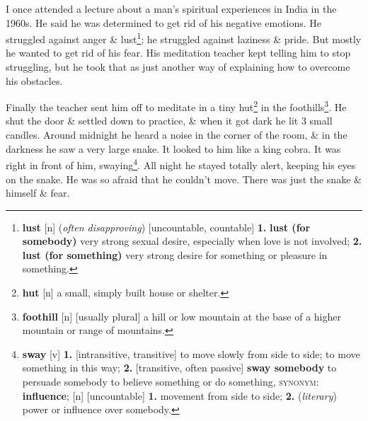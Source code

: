 \documentclass[oneside]{book}
\numberwithin{equation}{section}
\begin{document}
I once attended a lecture about a man's spiritual experiences in India in the 1960s. He said he was determined to get rid of his negative emotions. He struggled against anger \& lust\footnote{\textbf{lust} [n] (\textit{often disapproving}) [uncountable, countable] \textbf{1.} \textbf{lust (for somebody)} very strong sexual desire, especially when love is not involved; \textbf{2.} \textbf{lust (for something)} very strong desire for something or pleasure in something.}; he struggled against laziness \& pride. But mostly he wanted to get rid of his fear. His meditation teacher kept telling him to stop struggling, but he took that as just another way of explaining how to overcome his obstacles.

Finally the teacher sent him off to meditate in a tiny hut\footnote{\textbf{hut} [n] a small, simply built house or shelter.} in the foothills\footnote{\textbf{foothill} [n] [usually plural] a hill or low mountain at the base of a higher mountain or range of mountains.}. He shut the door \& settled down to practice, \& when it got dark he lit 3 small candles. Around midnight he heard a noise in the corner of the room, \& in the darkness he saw a very large snake. It looked to him like a king cobra. It was right in front of him, swaying\footnote{\textbf{sway} [v] \textbf{1.} [intransitive, transitive] to move slowly from side to side; to move something in this way; \textbf{2.} [transitive, often passive] \textbf{sway somebody} to persuade somebody to believe something or do something, \textsc{synonym}: \textbf{influence}; [n] [uncountable] \textbf{1.} movement from side to side; \textbf{2.} (\textit{literary}) power or influence over somebody.}. All night he stayed totally alert, keeping his eyes on the snake. He was so afraid that he couldn't move. There was just the snake \& himself \& fear.
\end{document}
